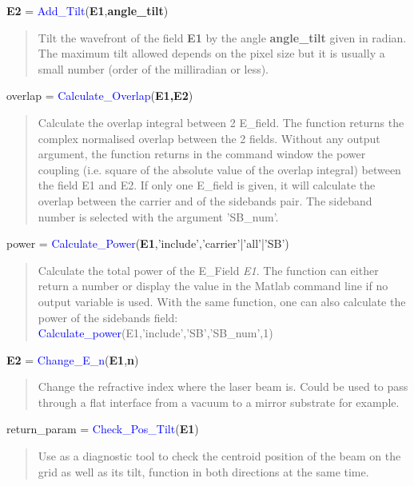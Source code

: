 \noindent \textbf{E2} = \textcolor{blue}{ Add\_Tilt}(\textbf{E1},\textbf{angle\_tilt})
\vspace*{-0.2cm}
\begin{quote}
Tilt the wavefront of the field \textbf{E1} by the angle \textbf{angle\_tilt} given in radian. The maximum tilt allowed depends on the pixel size but it is usually a small number (order of the milliradian or less).
\end{quote}

\noindent overlap = \textcolor{blue}{Calculate\_Overlap}(\textbf{E1,E2})
\vspace*{-0.2cm}
\begin{quote}
Calculate the overlap integral between 2 E\_field. The function returns the complex normalised overlap between the 2 fields. Without any output argument, the function returns in the command window the power coupling (i.e. square of the absolute value of the overlap integral) between the field E1 and E2.
If only one E\_field is given, it will calculate the overlap between the carrier and of the sidebands pair. The sideband number is selected with the argument 'SB\_num'.
\end{quote}

\noindent power = \textcolor{blue}{Calculate\_Power}(\textbf{E1},'include','carrier'|'all'|'SB')
\vspace*{-0.2cm}
\begin{quote}
Calculate the total power of the E\_Field \textsl{E1}. The function can either return a number or display the value in the Matlab command line if no output variable is used. With the same function, one can also calculate the power of the sidebands field:  
\textcolor{blue}{Calculate\_power}(E1,'include','SB','SB\_num',1)
\end{quote}

\noindent \textbf{E2} = \textcolor{blue}{Change\_E\_n}(\textbf{E1},\textbf{n})
\vspace*{-0.2cm}
\begin{quote}
Change the refractive index where the laser beam is. Could be used to pass through a flat interface from a vacuum to a mirror substrate for example.
\end{quote}

\noindent return\_param = \textcolor{blue}{Check\_Pos\_Tilt}(\textbf{E1})
\vspace*{-0.2cm}
\begin{quote}
Use as a diagnostic tool to check the centroid position of the beam on the grid as well as its tilt, function in both directions at the same time.
\end{quote}

